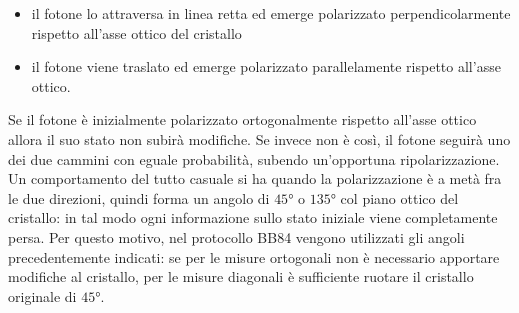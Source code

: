 \documentclass[italian,A4,12pt]{article}
\begin{document}
    \begin{itemize}
      \item il fotone lo attraversa in linea retta ed emerge polarizzato perpendicolarmente rispetto all'asse ottico del cristallo
      \item il fotone viene traslato ed emerge polarizzato parallelamente rispetto all'asse ottico.
    \end{itemize}
    Se il fotone è inizialmente polarizzato ortogonalmente rispetto all'asse ottico allora il suo stato non subirà modifiche. Se invece non è così, il fotone seguirà uno dei due cammini con eguale probabilità, subendo un'opportuna ripolarizzazione. Un comportamento del tutto casuale si ha quando la polarizzazione è a metà fra le due direzioni, quindi forma un angolo di $\ang{45}$ o $\ang{135}$ col piano ottico del cristallo: in tal modo ogni informazione sullo stato iniziale viene completamente persa.
    Per questo motivo, nel protocollo BB84 vengono utilizzati gli angoli precedentemente indicati: se per le misure ortogonali non è necessario apportare modifiche al cristallo, per le misure diagonali è sufficiente ruotare il cristallo originale di $\ang{45}$.
\end{document}
